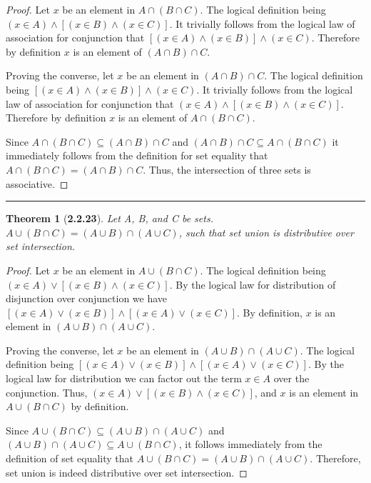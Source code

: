 \documentclass[a4paper, 12pt]{article}
\theoremstyle{plain}
\newtheorem*{theorem*}{Theorem}
\begin{document}
\begin{proof}
    Let $x$ be an element in $A \cap (B \cap C)$. The logical definition being \newline 
    $(x \in A) \land [(x \in B) \land (x \in C)]$. It trivially follows from the logical 
    law of association for conjunction that $[(x \in A) \land (x \in B)] \land (x \in C)$. 
    Therefore by definition $x$ is an element of $(A \cap B) \cap C$.
    
    Proving the converse, let $x$ be an element in $(A \cap B) \cap C$. The logical 
    definition being $[(x \in A) \land (x \in B)] \land (x \in C)$. It trivially follows 
    from the logical law of association for conjunction that \newline 
    $(x \in A) \land [(x \in B) \land (x \in C)]$. Therefore by definition $x$ is an element of 
    $A \cap (B \cap C)$.
    
    Since $A \cap (B \cap C) \subseteq (A \cap B) \cap C$ and 
    $(A \cap B) \cap C \subseteq A \cap (B \cap C)$ it immediately follows from the definition 
    for set equality that \newline $A \cap (B \cap C) = (A \cap B) \cap C$. Thus, the 
    intersection of three sets is associative.
\end{proof}
\begin{center}
    \rule{5.4in}{1pt}
\end{center}


\begin{theorem*}[\textbf{2.2.23}]
    Let A, B, and C be sets. $A \cup (B \cap C) = (A \cup B) \cap (A \cup C)$, such that set 
    union is distributive over set intersection.
\end{theorem*}

\begin{proof}
    Let $x$ be an element in $A \cup (B \cap C)$. The logical definition being \newline 
    $(x \in A) \lor [(x \in B) \land (x \in C)]$. By the logical law for distribution of 
    disjunction over conjunction we have 
    $[(x \in A) \lor (x \in B)] \land [(x \in A) \lor (x \in C)]$. By definition, $x$ is an 
    element in $(A \cup B) \cap (A \cup C)$.
    
    Proving the converse, let $x$ be an element in $(A \cup B) \cap (A \cup C)$. The logical 
    definition being $[(x \in A) \lor (x \in B)] \land [(x \in A) \lor (x \in C)]$. By the 
    logical law for distribution we can factor out the term $x \in A$ over the conjunction. 
    Thus, $(x \in A) \lor [(x \in B) \land (x \in C)]$, and $x$ is an element in 
    $A \cup (B \cap C)$ by definition.
    
    Since $A \cup (B \cap C) \subseteq (A \cup B) \cap (A \cup C)$ and \newline 
    $(A \cup B) \cap (A \cup C) \subseteq A \cup (B \cap C)$, it follows immediately from the 
    definition of set equality that $A \cup (B \cap C) = (A \cup B) \cap (A \cup C)$. Therefore, 
    set union is indeed distributive over set intersection.
\end{proof}
\end{document}
